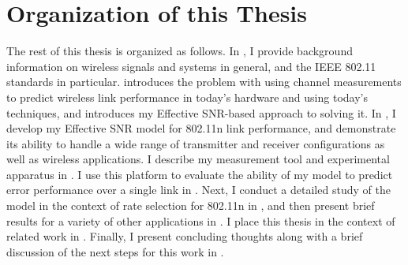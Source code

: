 \section{Organization of this Thesis}
\label{sec:intro_organization}
The rest of this thesis is organized as follows. In , I provide background information on wireless signals and systems in general, and the IEEE 802.11 standards in particular.  introduces the problem with using channel measurements to predict wireless link performance in today's hardware and using today's techniques, and introduces my Effective SNR-based approach to solving it. In , I develop my Effective SNR model for 802.11n link performance, and demonstrate its ability to handle a wide range of transmitter and receiver configurations as well as wireless applications. I describe my measurement tool and experimental apparatus in . I use this platform to evaluate the ability of my model to predict error performance over a single link in . Next, I conduct a detailed study of the model in the context of rate selection for 802.11n in , and then present brief results for a variety of other applications in . I place this thesis in the context of related work in . Finally, I present concluding thoughts along with a brief discussion of the next steps for this work in .

\ifx\mainfile\undefined

\fi
